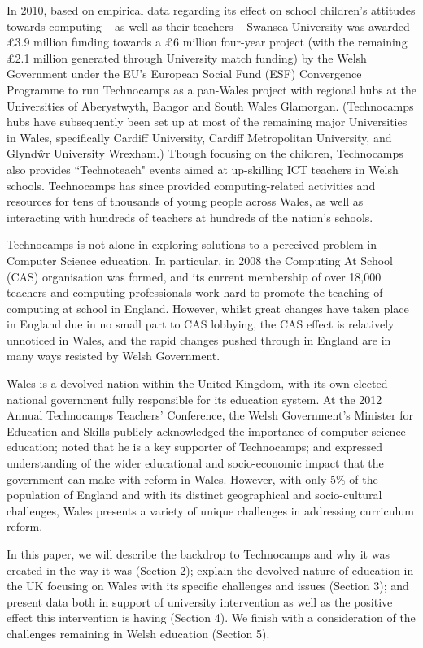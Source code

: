 \documentclass{sig-alternate}
\begin{document}
In 2010, based on empirical data
regarding its effect on school children's attitudes towards computing
-- as well as their teachers -- Swansea University was awarded
\pounds 3.9 million funding towards a \pounds 6 million four-year project
(with the remaining \pounds 2.1 million
generated through University match funding)
by the Welsh Government under the EU's European Social
Fund (ESF) Convergence Programme to run Technocamps as a pan-Wales
project with regional hubs at
the Universities of Aberystwyth, Bangor and
South Wales Glamorgan.
(Technocamps hubs have subsequently been set up at most of the remaining
major Universities in Wales, specifically Cardiff University,
Cardiff Metropolitan University, and Glynd\^wr University Wrexham.)
Though focusing on the children, Technocamps also provides ``Technoteach"
events aimed at up-skilling ICT teachers in Welsh schools.
Technocamps has since provided computing-related activities and resources
for tens of thousands of young people across Wales, as well as interacting
with hundreds of teachers at hundreds of the nation's schools.

Technocamps is not alone in exploring solutions to a
perceived problem in Computer Science education.
In particular, in 2008 the
Computing At School (CAS) organisation was formed, and its current
membership of over 18,000 teachers and computing professionals
work hard to promote the teaching of computing at school in England.
However, whilst great changes have taken place in England
due in no small part to CAS lobbying,
the CAS effect is relatively unnoticed in Wales,
and the rapid changes pushed through in England
are in many ways resisted by Welsh Government.

Wales is a devolved nation within the United Kingdom, with its own
elected national government fully responsible for its education system.
At the 2012 Annual Technocamps Teachers' Conference,
the Welsh Government's Minister for Education and Skills
publicly acknowledged the importance of computer science education;
noted that he is a key supporter of Technocamps;
and expressed understanding of the wider educational and
socio-economic impact that the government can make with reform in Wales.
However, with only 5\% of the population of England and with its distinct
geographical and socio-cultural challenges, Wales presents
a variety of unique challenges in addressing curriculum reform.

In this paper, we will describe the backdrop to Technocamps and why it
was created in the way it was (Section 2); explain the devolved nature
of education in the UK focusing on Wales with its specific challenges
and issues (Section 3); and present data both in support of university
intervention as well as the positive effect this intervention is
having (Section 4).  We finish with a consideration of the challenges
remaining in Welsh education (Section 5).
\end{document}
